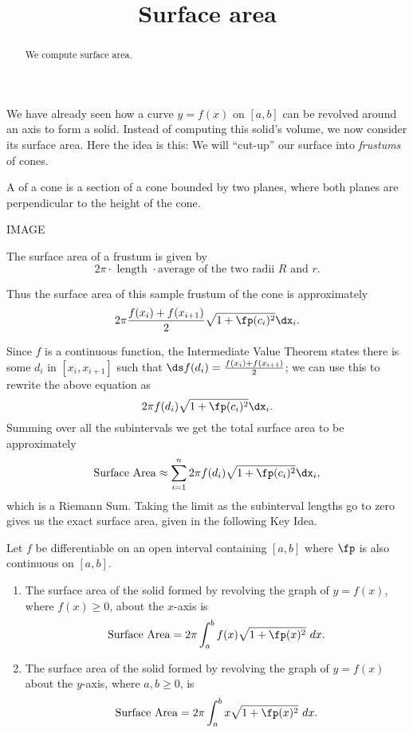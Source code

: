 \documentclass{ximera}
\title[Dig-In:]{Surface area}
\begin{document}
\begin{abstract}
We compute surface area.
\end{abstract}
\maketitle


We have already seen how a curve $y=f(x)$ on $[a,b]$ can be revolved
around an axis to form a solid. Instead of computing this solid's
volume, we now consider its surface area.  Here the idea is this: We
will ``cut-up'' our surface into \textit{frustums} of cones.

\begin{definition}
  A  of a cone is a section of a cone bounded by two
  planes, where both planes are perpendicular to the height of the
  cone.
  \begin{image}
    IMAGE
  \end{image}
  The surface area of a frustum is given by
\[
2\pi\cdot\text{ length }\cdot\text{average of the two radii $R$ and
  $r$}.
\]
\end{definition}




Thus the surface area of this sample frustum of the cone is
approximately
\[
2\pi\frac{f(x_i)+f(x_{i+1})}2\sqrt{1+\fp(c_i)^2}\dx_i.
\]

Since $f$ is a continuous function, the Intermediate Value Theorem
states there is some $d_i$ in $[x_i,x_{i+1}]$ such that $\ds f(d_i) =
\frac{f(x_i)+f(x_{i+1})}2$; we can use this to rewrite the above
equation as
\[
2\pi f(d_i)\sqrt{1+\fp(c_i)^2}\dx_i.
\]
Summing over all the
subintervals we get the total surface area to be approximately
$$\text{Surface Area}\approx \sum_{i=1}^n 2\pi f(d_i)\sqrt{1+\fp(c_i)^2}\dx_i,$$
which is a Riemann Sum. Taking the limit as the subinterval lengths go to zero gives us the exact surface area, given in the following Key Idea.

{Let $f$ be differentiable on an open interval containing $[a,b]$ where $\fp$ is also continuous on $[a,b]$. 
	\begin{enumerate}
	\item	The surface area of the solid formed by revolving the graph of $y=f(x)$, where $f(x)\geq0$, about the $x$-axis is
	$$\text{Surface Area} = 2\pi\int_a^b f(x)\sqrt{1+\fp(x)^2}\ dx.$$
	\item	The surface area of the solid formed by revolving the graph of $y=f(x)$ about the $y$-axis, where $a,b\geq0$, is
	$$\text{Surface Area} = 2\pi\int_a^b x\sqrt{1+\fp(x)^2}\ dx.$$
	\end{enumerate}
}
\end{document}
